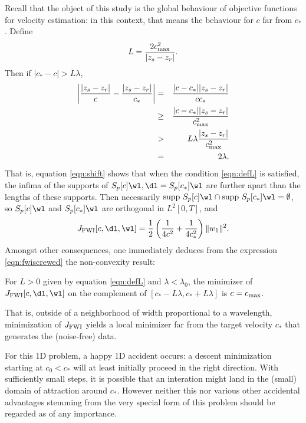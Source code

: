 Recall that the object of this study is the global behaviour of
objective functions for velocity estimation: in this context, that
means the behaviour for $c$ far from $c_*$. Define
\begin{equation}
  \label{eqn:defL}
  L = \frac{2 c_{\rm max}^2}{|z_s-z_r|}.
\end{equation}
Then if $|c_*-c| > L\lambda$,
\begin{eqnarray}
  \left|\frac{|z_s-z_r|}{c}-\frac{|z_s-z_r|}{c_*}\right|
  &=&\frac{|c-c_*||z_s-z_r|}{cc_*} \nonumber\\
  &\ge& \frac{|c-c_*||z_s-z_r|}{c_{\rm max}^2}\nonumber\\
  &>& L\lambda\frac{|z_s-z_r|}{c_{\rm max}^2} \nonumber\\
  &=& 2\lambda.
      \label{eqn:shift}
\end{eqnarray}
That is, equation \ref{eqn:shift} shows that when the condition
\ref{eqn:defL} is satisfied, the infima of the supports of $S_p[c]\wl, \dl=S_p[c_*]\wl$
are further apart than the lengths of these supports. Then
necessarily
  $\mbox{supp }S_p[c]\wl \cap \mbox{supp }S_p[c_*]\wl = \emptyset$, so
$S_p[c]\wl$ and $S_p[c_*]\wl$ are orthogonal in $L^2[0,T]$,
and
\begin{equation}
  \label{eqn:fwiscrewed}
   J_{\rm FWI}[c,\dl,\wl]  =
  \frac{1}{2}\left(\frac{1}{4c^2}+\frac{1}{4c_*^2}\right)\|w_1\|^2.
\end{equation}
Amongst other consequences, one immediately deduces from the
expression \ref{eqn:fwiscrewed} the non-convexity result:

\begin{theorem}
  \label{thm:thm1}
  For $L>0$ given by equation \ref{eqn:defL} and $\lambda <
  \lambda_0$, the minimizer of $J_{\rm FWI}[c,\dl,\wl]$ on the
  complement of $[c_*-L\lambda, c_*+L\lambda]$ is $c=c_{\rm max}$.
\end{theorem}

That is, outside of a neighborhood of width proportional to a
wavelength, minimization of $J_{\rm FWI}$ yields a local minimizer far from
the target velocity $c_*$ that generates the (noise-free) data.

For this 1D problem, a happy 1D accident occurs: a descent
minimization starting at $c_0 < c_*$ will at least initially proceed
in the right direction. With sufficiently small steps, it is possible
that an interation might land in the (small) domain of attraction
around $c_*$. However neither this nor various other accidental
advantages stemming from the very special form of this problem should
be regarded as of any importance.
 
